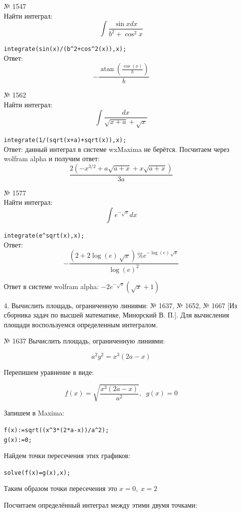 \documentclass[article, bachelor, och, pract]{SCWorks}
\begin{document}
\begin{itemize}
№ 1547\\
Найти интеграл:
$$\int\frac{\sin{x}dx}{b^2+\cos^2{x}}$$

\texttt{integrate(sin(x)/(b\^{}2+cos\^{}2(x)),x);}\\

Ответ: \[-\frac{\operatorname{atan}\left( \frac{\cos{(x)}}{b}\right) }{b}\]


№ 1562\\
Найти интеграл:
$$\int\frac{dx}{\sqrt{x+a}+\sqrt{x}}$$

\texttt{integrate(1/(sqrt(x+a)+sqrt(x)),x);}\\

Ответ: данный интеграл в системе wxMaxima не берётся.
Посчитаем через wolfram alpha и получим ответ: $$\frac{2(-x^{3/2}+a\sqrt{a+x}+x\sqrt{a+x})}{3a}$$


№ 1577\\
Найти интеграл:
$$\int e^{-\sqrt{x}}dx$$

\texttt{integrate(e\^{}sqrt(x),x);}\\

Ответ: \[-\frac{\left( 2+2\log{(e)}\,\sqrt{x}\right) \,{{\%{}e}^{-\log{(e)}\,\sqrt{x}}}}{{{\log{(e)}}^{2}}}\]

Ответ в системе wolfram alpha: $-2e^{-\sqrt{x}}(\sqrt{x}+1)$

\item[4.] Вычислить площадь, ограниченную линиями: № 1637, № 1652, № 1667 [Из сборника задач по высшей математике, Минорский В. П.]. Для вычисления площади воспользуемся определенным интегралом.

№ 1637
Вычислить площадь, ограниченную линиями:

$$a^2y^2=x^3(2a-x)$$

Перепишем уравнение в виде: 

$$f(x)=\sqrt{\frac{x^3(2a-x)}{a^2}}, \; \; g(x)=0$$

Запишем в Maxima:

\texttt{f(x):=sqrt((x\^{}3*(2*a-x))/a\^{}2);}\\
\texttt{g(x):=0;}

Найдем точки пересечения этих графиков:

\texttt{solve(f(x)=g(x),x);}

Таким образом точки пересечения это $x=0, \; x=2$

Посчитаем определённый интеграл между этими двумя точками:


\end{itemize}
\end{document}
